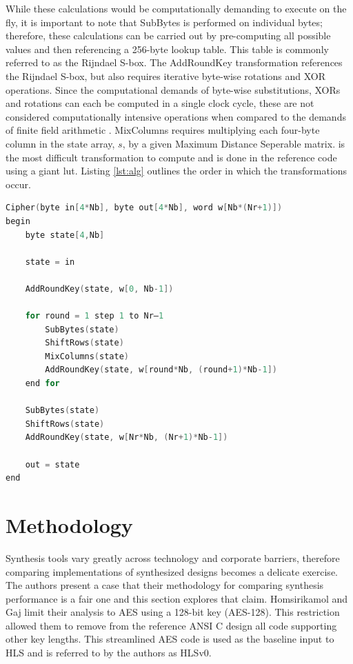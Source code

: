 \documentclass[11pt,journal,compsoc, onecolumn]{IEEEtran}
\begin{document}
While these calculations would be computationally demanding to execute on the fly\cite{15}, it is important to note that SubBytes is performed on individual bytes; therefore, these calculations can be carried out by pre-computing all possible values and then referencing a 256-byte lookup table. This table is commonly referred to as the Rijndael S-box\cite{13}. The AddRoundKey transformation references the Rijndael S-box, but also requires iterative byte-wise rotations and XOR operations. Since the computational demands of byte-wise substitutions, XORs and rotations can each be computed in a single clock cycle, these are not considered computationally intensive operations when compared to the demands of finite field arithmetic \cite{silva}. MixColumns requires multiplying each four-byte column in the state array, $s$, by a given Maximum Distance Seperable matrix. is the most difficult transformation to compute and is done in the reference code using a giant lut.
Listing \ref{lst:alg} outlines the order in which the transformations occur. 
\begin{lstlisting}[captionpos=b,language=c, frame=single,caption={AES Pseudo Code (reproduced from \cite{13})},label={lst:alg},keywordstyle=\color{black}]
Cipher(byte in[4*Nb], byte out[4*Nb], word w[Nb*(Nr+1)])
begin
	byte state[4,Nb]

	state = in

	AddRoundKey(state, w[0, Nb-1])

	for round = 1 step 1 to Nr–1
		SubBytes(state)
		ShiftRows(state)
		MixColumns(state)
		AddRoundKey(state, w[round*Nb, (round+1)*Nb-1])
	end for

	SubBytes(state)
	ShiftRows(state)
	AddRoundKey(state, w[Nr*Nb, (Nr+1)*Nb-1])

	out = state
end
\end{lstlisting}
\section{Methodology}
Synthesis tools vary greatly across technology and corporate barriers, therefore comparing implementations of synthesized designs becomes a delicate exercise. The authors present a case that their methodology for comparing synthesis performance is a fair one and this section explores that claim.
Homsirikamol and Gaj limit their analysis to AES using a 128-bit key (AES-128). This restriction allowed them to remove from the reference ANSI C design all code supporting other key lengths\cite{17}. This streamlined AES code is used as the baseline input to HLS and is referred to by the authors as HLSv0.
\end{document}
